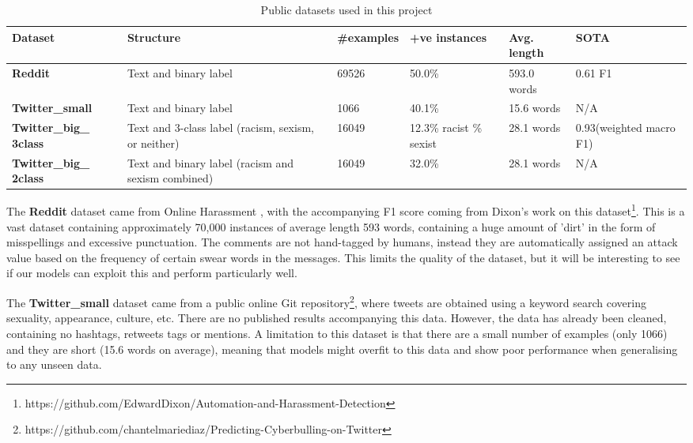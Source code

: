 \documentclass[12pt,a4paper]{article}
\begin{document}
\begin{table}[htb]
	\centering
	\caption{Public datasets used in this project}
	\label{data}
	\hspace*{-2.2cm}
	\begin{tabular}{p{3.4cm} p{5.2cm} p{2cm} p{2.5cm} p{2.2cm} p{2.2cm}} \hline\hline
		\textbf{Dataset} & \textbf{Structure} & \textbf{\#examples} & \textbf{+ve instances} & \textbf{Avg. length} & \textbf{SOTA} \\ \hline
		\textbf{Reddit} & Text and binary label & 69526 & 50.0\% & 593.0 words & 0.61 F1\\ \hline
		\textbf{Twitter\_small} & Text and binary label & 1066 & 40.1\% & 15.6 words & N/A \\ \hline
		\textbf{Twitter\_big\_ 3class} & Text and 3-class label \newline (racism, sexism, or neither) & 16049 & 12.3\% racist \newline 19.7\% sexist & 28.1 words & 0.93\newline (weighted macro F1) \\ \hline
		\textbf{Twitter\_big\_ 2class} & Text and binary label \newline (racism and sexism combined) & 16049 & 32.0\% & 28.1 words & N/A \\ \hline
	\end{tabular}
\end{table}

The \textbf{Reddit} dataset came from Online Harassment \cite{Golbeck}, with the accompanying F1 score coming from Dixon's work \citeyear{Dixon} on this dataset\footnote{https://github.com/EdwardDixon/Automation-and-Harassment-Detection}. This is a vast dataset containing approximately 70,000 instances of average length 593 words, containing a huge amount of 'dirt' in the form of misspellings and excessive punctuation. The comments are not hand-tagged by humans, instead they are automatically assigned an attack value based on the frequency of certain swear words in the messages. This limits the quality of the dataset, but it will be interesting to see if our models can exploit this and perform particularly well.

The \textbf{Twitter\_small} dataset came from a public online Git repository\footnote{https://github.com/chantelmariediaz/Predicting-Cyberbulling-on-Twitter}, where tweets are obtained using a keyword search covering sexuality, appearance, culture, etc. There are no published results accompanying this data. However, the data has already been cleaned, containing no hashtags, retweets tags or mentions. A limitation to this dataset is that there are a small number of examples (only 1066) and they are short (15.6 words on average), meaning that models might overfit to this data and show poor performance when generalising to any unseen data.
\end{document}
